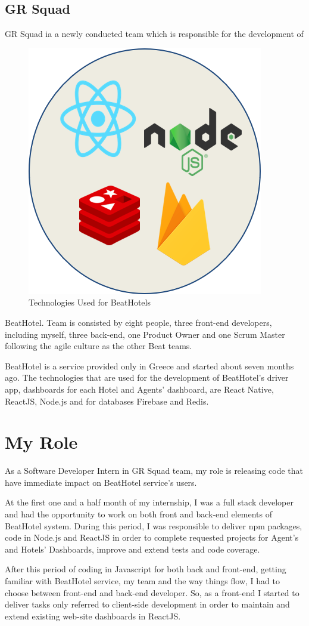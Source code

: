 \subsection{ GR Squad }
GR Squad ia a newly conducted team which is responsible for the development of 
\begin{figure}
	\begin{center}
		\includegraphics[scale=0.25]{images/technologies_used.png}
	\end{center}
	\caption{Technologies Used for BeatHotels}
\end{figure}
BeatHotel. Team is consisted by eight people, three front-end developers, including myself, three back-end, one Product Owner and one Scrum Master following the agile culture as the other Beat teams.\par 
BeatHotel is a service provided only in Greece and started about seven months ago. The technologies that are used for the development of BeatHotel's driver app, dashboards for each Hotel and Agents' dashboard, are React Native, ReactJS, Node.js and for databases Firebase and Redis.

\section{ My Role }
As a Software Developer Intern in GR Squad team, my role is releasing code that have immediate impact on BeatHotel service's users. \par
At the first one and a half month of my internship, I was a full stack developer and had the opportunity to work on both front and back-end elements of BeatHotel system. During this period, I was responsible to deliver npm packages, code in Node.js and ReactJS in order to complete requested projects for Agent's and Hotels' Dashboards, improve and extend tests and code coverage.\par 
After this period of coding in Javascript for both back and front-end, getting familiar with BeatHotel service, my team and the way things flow, I had to choose between front-end and back-end developer. So, as a front-end I started to deliver tasks only referred to client-side development in order to maintain and extend existing web-site dashboards in ReactJS.
\newpage
